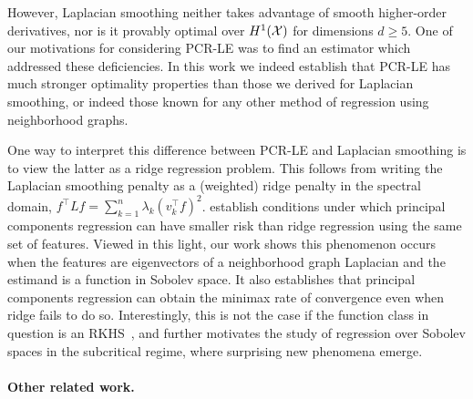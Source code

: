 However, Laplacian smoothing neither takes advantage of smooth higher-order derivatives, nor is it provably optimal over $H^1(\mathcal{X})$ for dimensions $d \geq 5$. One of our motivations for considering PCR-LE was to find an estimator which addressed these deficiencies. In this work we indeed establish that PCR-LE has much stronger optimality properties than those we derived for Laplacian smoothing, or indeed those known for any other method of regression using neighborhood graphs. 

One way to interpret this difference between PCR-LE and Laplacian smoothing is to view the latter as a ridge regression problem. This follows from writing the Laplacian smoothing penalty as a (weighted) ridge penalty in the spectral domain,  $f^{\top} L f  = \sum_{k = 1}^{n} \lambda_k(v_k^{\top}f)^2$. \citet{dhillon2013} establish conditions under which principal components regression can have smaller risk than ridge regression using the same set of features. Viewed in this light, our work shows this phenomenon occurs when the features are eigenvectors of a neighborhood graph Laplacian and the estimand is a function in Sobolev space. It also establishes that principal components regression can obtain the minimax rate of convergence even when ridge fails to do so. Interestingly, this is not the case if the function class in question is an RKHS~\citep{dicker2017}, and further motivates the study of regression over Sobolev spaces in the subcritical regime, where surprising new phenomena emerge.

\paragraph{Other related work.}

